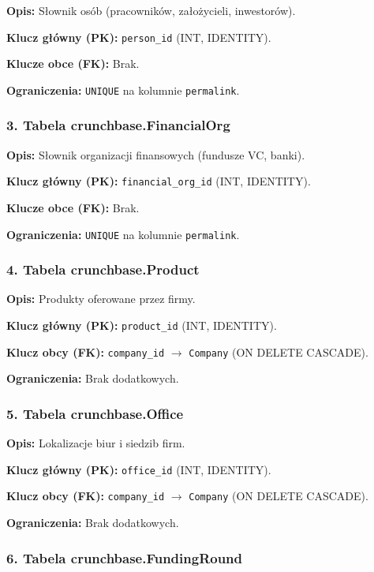 \documentclass[12pt,a4paper]{article}
\begin{document}
\textbf{Opis:} Słownik osób (pracowników, założycieli, inwestorów).

\textbf{Klucz główny (PK):} \texttt{person\_id} (INT, IDENTITY).

\textbf{Klucze obce (FK):} Brak.

\textbf{Ograniczenia:} \texttt{UNIQUE} na kolumnie \texttt{permalink}.

\subsubsection{3. Tabela crunchbase.FinancialOrg}

\textbf{Opis:} Słownik organizacji finansowych (fundusze VC, banki).

\textbf{Klucz główny (PK):} \texttt{financial\_org\_id} (INT, IDENTITY).

\textbf{Klucze obce (FK):} Brak.

\textbf{Ograniczenia:} \texttt{UNIQUE} na kolumnie \texttt{permalink}.

\subsubsection{4. Tabela crunchbase.Product}

\textbf{Opis:} Produkty oferowane przez firmy.

\textbf{Klucz główny (PK):} \texttt{product\_id} (INT, IDENTITY).

\textbf{Klucz obcy (FK):} \texttt{company\_id} $\rightarrow$ \texttt{Company} (ON DELETE CASCADE).

\textbf{Ograniczenia:} Brak dodatkowych.

\subsubsection{5. Tabela crunchbase.Office}

\textbf{Opis:} Lokalizacje biur i siedzib firm.

\textbf{Klucz główny (PK):} \texttt{office\_id} (INT, IDENTITY).

\textbf{Klucz obcy (FK):} \texttt{company\_id} $\rightarrow$ \texttt{Company} (ON DELETE CASCADE).

\textbf{Ograniczenia:} Brak dodatkowych.

\subsubsection{6. Tabela crunchbase.FundingRound}
\end{document}
